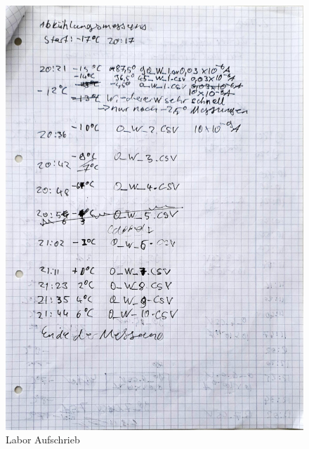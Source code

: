 \begin{figure}
	\includegraphics[scale=0.35]{Bild/Lab3}
	\centering
	\caption{Labor Aufschrieb}
\end{figure}
